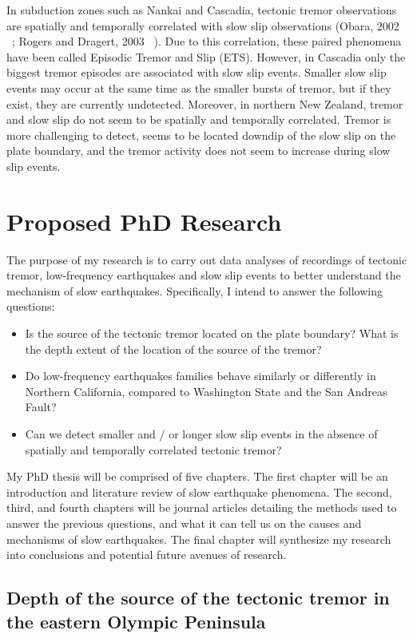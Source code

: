 \documentclass[letterpaper, 12pt]{article}
\begin{document}
In subduction zones such as Nankai and Cascadia, tectonic tremor observations are spatially and temporally correlated with slow slip observations (Obara, 2002 ~\cite{OBA_2002}; Rogers and Dragert, 2003 ~\cite{ROG_2003}). Due to this correlation, these paired phenomena have been called Episodic Tremor and Slip (ETS). However, in Cascadia only the biggest tremor episodes are associated with slow slip events. Smaller slow slip events may occur at the same time as the smaller bursts of tremor, but if they exist, they are currently undetected. Moreover, in northern New Zealand, tremor and slow slip do not seem to be spatially and temporally correlated. Tremor is more challenging to detect, seems to be located downdip of the slow slip on the plate boundary, and the tremor activity does not seem to increase during slow slip events.

\section{Proposed PhD Research}

The purpose of my research is to carry out data analyses of recordings of tectonic tremor, low-frequency earthquakes and slow slip events to better understand the mechanism of slow earthquakes. Specifically, I intend to answer the following questions:

\begin{itemize}
\item Is the source of the tectonic tremor located on the plate boundary? What is the depth extent of the location of the source of the tremor?
\item Do low-frequency earthquakes families behave similarly or differently in Northern California, compared to Washington State and the San Andreas Fault?
\item Can we detect smaller and / or longer slow slip events in the absence of spatially and temporally correlated tectonic tremor?
\end{itemize}

My PhD thesis will be comprised of five chapters. The first chapter will be an introduction and literature review of slow earthquake phenomena. The second, third, and fourth chapters will be journal articles detailing the methods used to answer the previous questions, and what it can tell us on the causes and mechanisms of slow earthquakes. The final chapter will synthesize my research into conclusions and potential future avenues of research.

\subsection{Depth of the source of the tectonic tremor in the eastern Olympic Peninsula}
\end{document}
